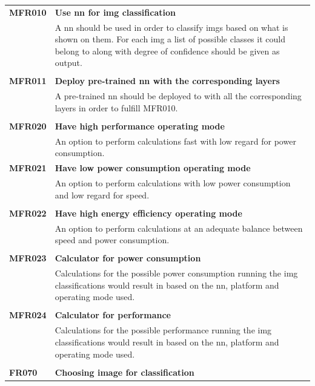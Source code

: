 \documentclass[parskip=full]{scrartcl}
\begin{document}
\begin{tabular}{p{2cm}p{12cm}}

\textbf{MFR010} & \textbf{Use \gls{nn} for \gls{img} classification}\\                                     
& A \gls{nn} should be used in order to classify \glspl{img} based on what is shown on them. For each \gls{img} a list of possible classes it could belong to along with degree of confidence should be given as output.\\
& \\
\textbf{MFR011} & \textbf{Deploy pre-trained \gls{nn} with the corresponding layers}\\
& A pre-trained \gls{nn} should be deployed to with all the corresponding layers in order to fulfill MFR010.\\
& \\
\textbf{MFR020} & \textbf{Have high performance operating mode}\\                                     
& An option to perform calculations fast with low regard for power consumption.\\
\textbf{MFR021} & \textbf{Have low power consumption operating mode}\\                                     
& An option to perform calculations with low power consumption and low regard for speed.\\
& \\
\textbf{MFR022} & \textbf{Have high energy efficiency operating mode}\\                                     
& An option to perform calculations at an adequate balance between speed and power consumption.\\
& \\
\textbf{MFR023} & \textbf{Calculator for power consumption}\\                                     
& Calculations for the possible power consumption running the \gls{img} classifications would result in based on the \gls{nn}, platform and operating mode used.\\
& \\
\textbf{MFR024} & \textbf{Calculator for performance}\\                                     
& Calculations for the possible performance running the \gls{img} classifications would result in based on the \gls{nn}, platform and operating mode used.\\
& \\
\textbf{FR070} & \textbf{Choosing image for classification}\\

\end{tabular}
\end{document}
